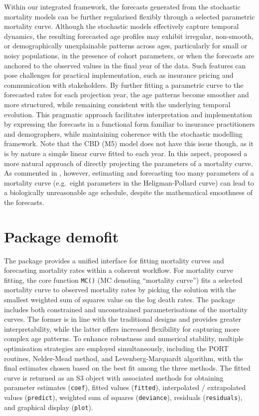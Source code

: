 Within our integrated framework, the forecasts generated from the stochastic mortality models can be further regularised flexibly through a selected parametric mortality curve. Although the stochastic models effectively capture temporal dynamics, the resulting forecasted age profiles may exhibit irregular, non-smooth, or demographically unexplainable patterns across ages, particularly for small or noisy populations, in the presence of cohort parameters, or when the forecasts are anchored to the observed values in the final year of the data. Such features can pose challenges for practical implementation, such as insurance pricing and communication with stakeholders. By further fitting a parametric curve to the forecasted rates for each projection year, the age patterns become smoother and more structured, while remaining consistent with the underlying temporal evolution. This pragmatic approach facilitates interpretation and implementation by expressing the forecasts in a functional form familiar to insurance practitioners and demographers, while maintaining coherence with the stochastic modelling framework. Note that the CBD (M5) model does not have this issue though, as it is by nature a simple linear curve fitted to each year. In this aspect, \citet{McNown1989} proposed a more natural approach of directly projecting the parameters of a mortality curve. As commented in \citet{Li2019}, however, estimating and forecasting too many parameters of a mortality curve (e.g.~eight parameters in the Heligman-Pollard curve) can lead to a biologically unreasonable age schedule, despite the mathematical smoothness of the forecasts.

\section{Package demofit}\label{package-demofit}

The  package provides a unified interface for fitting mortality curves and forecasting mortality rates within a coherent workflow. For mortality curve fitting, the core function \texttt{MC()} (MC denoting ``mortality curve'') fits a selected mortality curve to observed mortality rates by picking the solution with the smallest weighted sum of squares value on the log death rates. The package includes both constrained and unconstrained parameterisations of the mortality curves. The former is in line with the traditional designs and provides greater interpretability, while the latter offers increased flexibility for capturing more complex age patterns. To enhance robustness and numerical stability, multiple optimisation strategies are employed simultaneously, including the PORT routines, Nelder-Mead method, and Levenberg-Marquardt algorithm, with the final estimates chosen based on the best fit among the three methods. The fitted curve is returned as an S3 object with associated methods for obtaining parameter estimates (\texttt{coef}), fitted values (\texttt{fitted}), interpolated / extrapolated values (\texttt{predict}), weighted sum of squares (\texttt{deviance}), residuals (\texttt{residuals}), and graphical display (\texttt{plot}).

